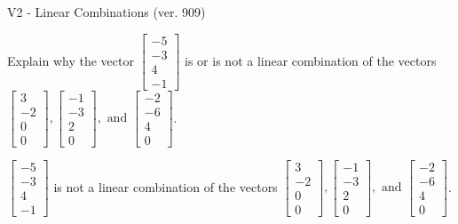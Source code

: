 \begin{exercise}
  \begin{exerciseTitle}V2 - Linear Combinations (ver. 909)\end{exerciseTitle}
  \begin{exerciseStatement}
    Explain why the vector \(\left[\begin{array}{c}
-5 \\
-3 \\
4 \\
-1
\end{array}\right]\)  is or is not a linear 
	combination of the vectors \(\left[\begin{array}{c}
3 \\
-2 \\
0 \\
0
\end{array}\right] , \left[\begin{array}{c}
-1 \\
-3 \\
2 \\
0
\end{array}\right] , \text{ and } \left[\begin{array}{c}
-2 \\
-6 \\
4 \\
0
\end{array}\right]\).
	


  \end{exerciseStatement}
  \begin{exerciseAnswer}
   \(\left[\begin{array}{c}
-5 \\
-3 \\
4 \\
-1
\end{array}\right]\) 
  	 is not  
	a linear combination of the vectors \(\left[\begin{array}{c}
3 \\
-2 \\
0 \\
0
\end{array}\right] , \left[\begin{array}{c}
-1 \\
-3 \\
2 \\
0
\end{array}\right] , \text{ and } \left[\begin{array}{c}
-2 \\
-6 \\
4 \\
0
\end{array}\right]\).

	
  


  \end{exerciseAnswer}
\end{exercise}